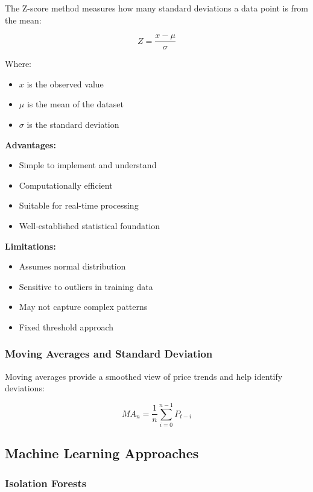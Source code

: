 The Z-score method measures how many standard deviations a data point is from the mean:

\begin{equation}
Z = \frac{x - \mu}{\sigma}
\end{equation}

Where:
\begin{itemize}
    \item $x$ is the observed value
    \item $\mu$ is the mean of the dataset
    \item $\sigma$ is the standard deviation
\end{itemize}

\textbf{Advantages:}
\begin{itemize}
    \item Simple to implement and understand
    \item Computationally efficient
    \item Suitable for real-time processing
    \item Well-established statistical foundation
\end{itemize}

\textbf{Limitations:}
\begin{itemize}
    \item Assumes normal distribution
    \item Sensitive to outliers in training data
    \item May not capture complex patterns
    \item Fixed threshold approach
\end{itemize}

\subsubsection{Moving Averages and Standard Deviation}

Moving averages provide a smoothed view of price trends and help identify deviations:

\begin{equation}
MA_n = \frac{1}{n}\sum_{i=0}^{n-1} P_{t-i}
\end{equation}

\subsection{Machine Learning Approaches}

\subsubsection{Isolation Forests}

